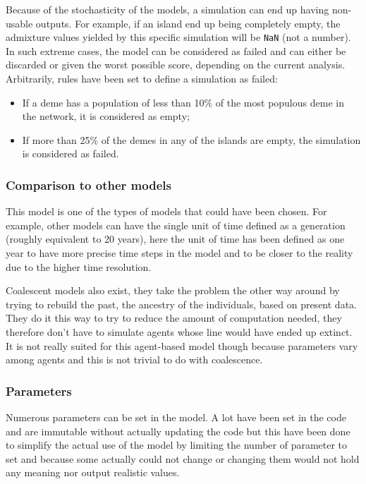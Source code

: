 \documentclass[a4paper,12pt]{report}
\begin{document}
Because of the stochasticity of the models, a simulation can end up having non-usable outputs. For example, if an island end up being completely empty, the admixture values yielded by this specific simulation will be \texttt{NaN} (not a number). In such extreme cases, the model can be considered as failed and can either be discarded or given the worst possible score, depending on the current analysis. Arbitrarily, rules have been set to define a simulation as failed:
\begin{itemize}
	\item If a deme has a population of less than 10\% of the most populous deme in the network, it is considered as empty;
	\item If more than 25\% of the demes in any of the islands are empty, the simulation is considered as failed.
\end{itemize}

\subsubsection{Comparison to other models}
This model is one of the types of models that could have been chosen. For example, other models can have the single unit of time defined as a generation (roughly equivalent to 20 years), here the unit of time has been defined as one year to have more precise time steps in the model and to be closer to the reality due to the higher time resolution.

Coalescent models also exist, they take the problem the other way around by trying to rebuild the past, the ancestry of the individuals, based on present data. They do it this way to try to reduce the amount of computation needed, they therefore don’t have to simulate agents whose line would have ended up extinct. It is not really suited for this agent-based model though because parameters vary among agents and this is not trivial to do with coalescence.

\subsubsection{Parameters}
Numerous parameters can be set in the model. A lot have been set in the code and are immutable without actually updating the code but this have been done to simplify the actual use of the model by limiting the number of parameter to set and because some actually could not change or changing them would not hold any meaning nor output realistic values.
\end{document}
